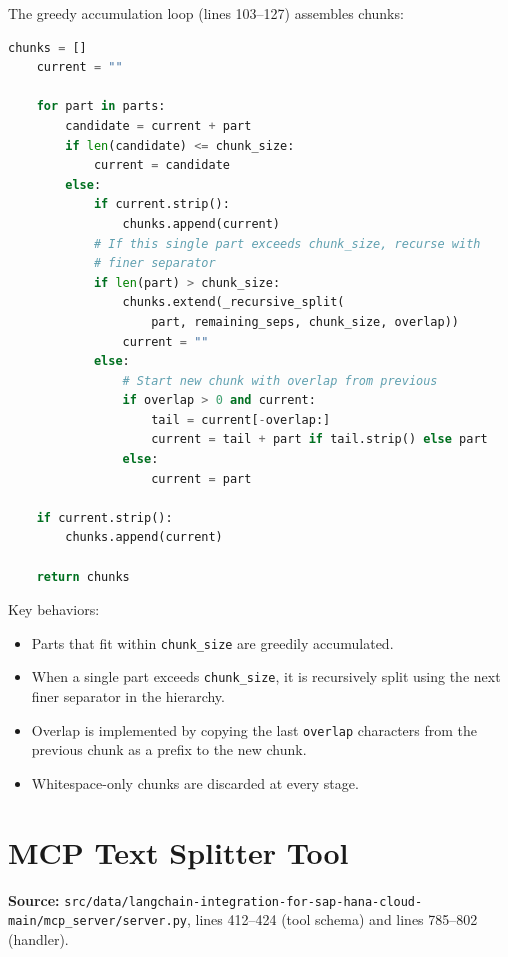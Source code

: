 \documentclass[11pt]{article}
\begin{document}
The greedy accumulation loop (lines 103--127) assembles chunks:

\begin{lstlisting}[language=Python,caption={Chunk assembly --- lines 103--128}]
    chunks = []
    current = ""

    for part in parts:
        candidate = current + part
        if len(candidate) <= chunk_size:
            current = candidate
        else:
            if current.strip():
                chunks.append(current)
            # If this single part exceeds chunk_size, recurse with
            # finer separator
            if len(part) > chunk_size:
                chunks.extend(_recursive_split(
                    part, remaining_seps, chunk_size, overlap))
                current = ""
            else:
                # Start new chunk with overlap from previous
                if overlap > 0 and current:
                    tail = current[-overlap:]
                    current = tail + part if tail.strip() else part
                else:
                    current = part

    if current.strip():
        chunks.append(current)

    return chunks
\end{lstlisting}

Key behaviors:
\begin{itemize}
  \item Parts that fit within \texttt{chunk\_size} are greedily accumulated.
  \item When a single part exceeds \texttt{chunk\_size}, it is recursively split
        using the next finer separator in the hierarchy.
  \item Overlap is implemented by copying the last \texttt{overlap} characters
        from the previous chunk as a prefix to the new chunk.
  \item Whitespace-only chunks are discarded at every stage.
\end{itemize}

\section{MCP Text Splitter Tool}
\label{sec:mcp-splitter}

\noindent\textbf{Source:}
\texttt{src/data/langchain-integration-for-sap-hana-cloud-main/mcp\_server/server.py},
lines 412--424 (tool schema) and lines 785--802 (handler).
\end{document}

